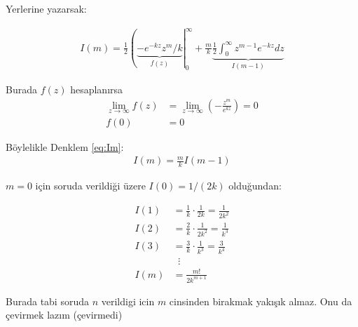 \documentclass{article}
\begin{document}
Yerlerine yazarsak:

\begin{align}
    \label{eq:Im}
    I(m) = \frac{1}{2}\left(\underbrace{-e^{-kz}z^m/k}_{f(z)}\right|_0^\infty + \frac{m}{k}\underbrace{\frac{1}{2}\int_0^\infty z^{m-1}e^{-kz}dz}_{I(m-1)} 
\end{align}

Burada $f(z)$ hesaplanırsa 
\begin{align}
\lim_{z \to \infty} f(z) &= \lim_{z \to \infty} \left(-\frac{z^m}{e^{kz}}\right) = 0 \\
f(0) &= 0 
\end{align}


Böylelikle Denklem \eqref{eq:Im}: 
\begin{align}
    I(m) = \frac{m}{k} I(m-1) 
\end{align}

$m=0$ için soruda verildiği üzere $I(0) = 1/(2k)$ olduğundan: 

\begin{align}
    I(1) &= \frac{1}{k} \cdot \frac{1}{2k} = \frac{1}{2k^2} \\
    I(2) &= \frac{2}{k} \cdot \frac{1}{2k^2} = \frac{1}{k^3} \\
    I(3) &= \frac{3}{k} \cdot \frac{1}{k^3} = \frac{3}{k^4} \\
      & \;\;\vdots \\
    I(m) &= \frac{m!}{2k^{m+1}} 
\end{align}

Burada tabi soruda $n$ verildigi icin $m$ cinsinden birakmak yakışık almaz. Onu da çevirmek lazım (çevirmedi)
\end{document}
